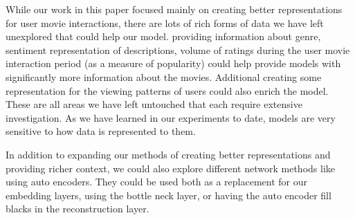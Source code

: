 While our work in this paper focused mainly on creating better representations for user movie interactions, there are lots of rich forms of data we have left unexplored that could help our model. providing information about genre, sentiment representation of descriptions, volume of ratings during the user movie interaction period (as a measure of popularity) could help provide models with significantly more information about the movies. Additional creating some representation for the viewing patterns of users could also enrich the model. These are all areas we have left untouched that each require extensive investigation. As we have learned in our experiments to date, models are very sensitive to how data is represented to them.

In addition to expanding our methods of creating better representations and providing richer context, we could also explore different network methods like using auto encoders. They could be used both as a replacement for our embedding layers, using the bottle neck layer, or having the auto encoder fill blacks in the reconstruction layer.